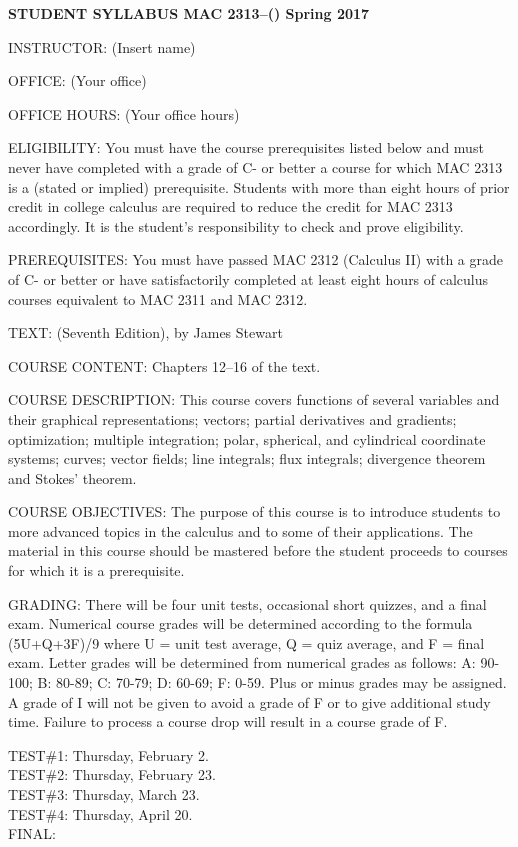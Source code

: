 \documentclass[12pt,oneside]{amsart}
\begin{document}
\centerline{\bf STUDENT SYLLABUS \hfill MAC 2313--() \hfill Spring 2017}

\noindent INSTRUCTOR: (Insert name)

\noindent OFFICE: (Your office)

\noindent OFFICE HOURS: (Your office hours)

\noindent ELIGIBILITY: You must have the course prerequisites listed below and must
never have completed with a grade of C- or better a course for which MAC
2313 is a (stated or implied) prerequisite. Students with more than eight
hours of prior credit in college calculus are required to reduce the
credit for MAC 2313 accordingly. It is the student's responsibility to
check and prove eligibility.


\noindent PREREQUISITES: You must have passed MAC 2312 (Calculus II) with a grade
of C- or better or have satisfactorily completed at least eight hours of
calculus courses equivalent to MAC 2311 and MAC 2312.


\noindent TEXT:  (Seventh Edition), by
James Stewart

\noindent COURSE CONTENT: Chapters 12--16 of the text.

\noindent COURSE DESCRIPTION: This course covers functions of several variables and their graphical representations; vectors; partial derivatives and gradients; optimization; multiple integration; polar, spherical, and cylindrical coordinate systems; curves; vector fields; line integrals; flux integrals; divergence theorem and Stokes' theorem.  

\noindent COURSE OBJECTIVES: The purpose of this course is to introduce students to
more advanced topics in the calculus and to some of their applications. The
material in this course should be mastered before the student proceeds to
courses for which it is a prerequisite.

\noindent GRADING: There will be four unit tests, occasional short quizzes, and a final exam.
Numerical course grades will be determined according to the
formula (5U+Q+3F)/9 where U = unit test average, Q = quiz average, and F = final exam.
Letter grades will be determined from numerical grades
as follows: A: 90-100; B: 80-89; C: 70-79; D: 60-69; F: 0-59. Plus or
minus grades may be assigned. A grade of I will not be given to avoid a grade of F
or to give additional study time. Failure to process a course drop will
result in a course grade of F.

\noindent TEST\#1: Thursday, February 2.
\\
TEST\#2: Thursday, February 23.
\\
TEST\#3: Thursday, March 23.
\\
TEST\#4: Thursday, April 20.
\\
FINAL:
\end{document}
